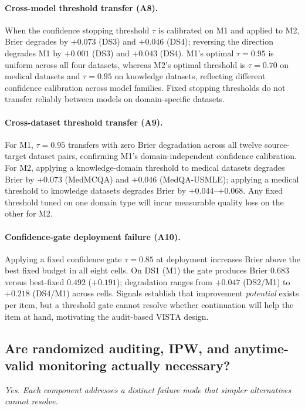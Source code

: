 \documentclass[a4paper,fleqn]{cas-sc}
\theoremstyle{plain}
\theoremstyle{definition}
\theoremstyle{remark}
\begin{document}
\paragraph{Cross-model threshold transfer (A8).}
When the confidence stopping threshold $\tau$ is calibrated on M1 and applied
to M2, Brier degrades by $+0.073$ (DS3) and $+0.046$ (DS4); reversing the
direction degrades M1 by $+0.001$ (DS3) and $+0.043$ (DS4).
M1's optimal $\tau{=}0.95$ is uniform across all four datasets,
whereas M2's optimal threshold is $\tau{=}0.70$ on medical datasets
and $\tau{=}0.95$ on knowledge datasets, reflecting different confidence
calibration across model families.
Fixed stopping thresholds do not transfer reliably between models on
domain-specific datasets.

\paragraph{Cross-dataset threshold transfer (A9).}
For M1, $\tau{=}0.95$ transfers with zero Brier degradation across all twelve
source-target dataset pairs, confirming M1's domain-independent confidence
calibration.
For M2, applying a knowledge-domain threshold to medical datasets degrades
Brier by $+0.073$ (MedMCQA) and $+0.046$ (MedQA-USMLE); applying a medical
threshold to knowledge datasets degrades Brier by $+0.044$--$+0.068$.
Any fixed threshold tuned on one domain type will incur measurable quality
loss on the other for M2.

\paragraph{Confidence-gate deployment failure (A10).}
Applying a fixed confidence gate $\tau{=}0.85$ at deployment increases Brier
above the best fixed budget in all eight cells.
On DS1 (M1) the gate produces Brier $0.683$ versus best-fixed $0.492$
($+0.191$); degradation ranges from $+0.047$ (DS2/M1) to $+0.218$ (DS4/M1)
across cells.
Signals establish that improvement \emph{potential} exists per item, but a
threshold gate cannot resolve whether continuation will help the item at hand,
motivating the audit-based VISTA design.

\subsection{Are randomized auditing, IPW, and anytime-valid monitoring
  actually necessary?}
\label{sec:ablation}

\textit{Yes. Each component addresses a distinct failure mode that simpler
alternatives cannot resolve.}
\end{document}
